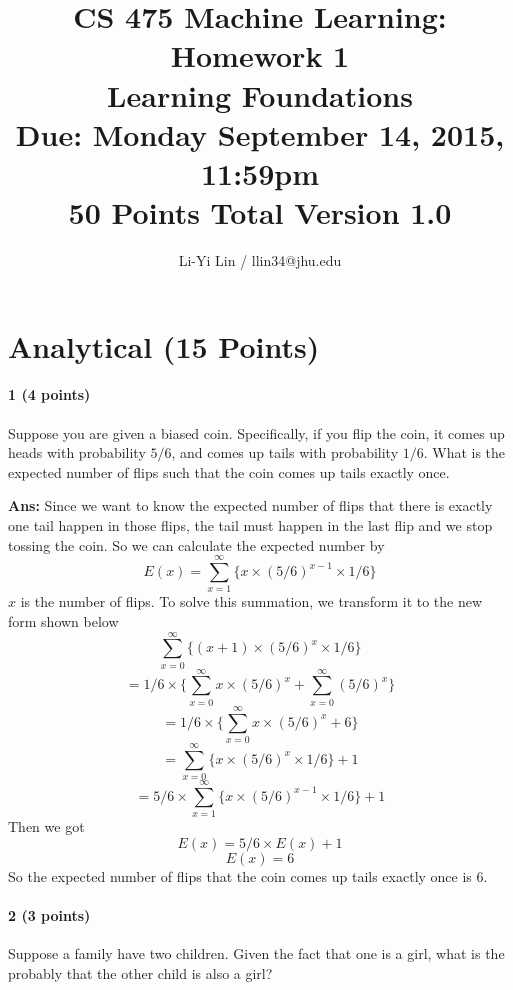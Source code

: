 \documentclass[11pt]{article}
\title{CS 475 Machine Learning: Homework 1\\Learning Foundations\\
\Large{Due: Monday September 14, 2015, 11:59pm}\\
50 Points Total \hspace{1cm} Version 1.0}
\author{Li-Yi Lin / llin34@jhu.edu}
\date{}
\begin{document}
\large
\maketitle
\thispagestyle{headings}

\vspace{-.5in}




\section{Analytical (15 Points)}

\paragraph{1 (4 points)} Suppose you are given a biased coin. Specifically, if you flip the coin, it comes up heads with probability $5/6$, and comes up tails with probability $1/6$.  What is the expected number of flips such that the coin comes up tails exactly once.

\noindent
\textbf{Ans:} 
Since we want to know the expected number of flips that there is exactly one tail happen in those flips, the tail must happen in the last flip and we stop tossing the coin. So we can calculate the expected number by 
$$E(x) = \sum_{x = 1}^{\infty} \{x \times (5/6)^{x-1} \times 1/6\}$$
$x$ is the number of flips.
To solve this summation, we transform it to the new form shown below
$$\sum_{x=0}^{\infty} \{(x + 1) \times (5/6)^{x} \times 1/6\} $$
$$= 1/6 \times \{\sum_{x=0}^{\infty} x \times (5/6)^{x} + \sum_{x=0}^{\infty} (5/6)^{x}\}$$
$$= 1/6 \times \{\sum_{x=0}^{\infty} x \times (5/6)^{x} + 6\}$$
$$= \sum_{x = 0}^{\infty} \{x \times (5/6)^{x} \times 1/6\} + 1$$
$$= 5/6 \times \sum_{x = 1}^{\infty} \{x \times (5/6)^{x-1} \times 1/6\} + 1$$
Then we got
$$E(x) = 5/6 \times E(x) + 1$$
$$E(x) = 6$$
So the expected number of flips that the coin comes up tails exactly once is 6.


\paragraph{2 (3 points)} Suppose a family have two children. Given the fact that one is a girl, what is the probably that the other child is also a girl?
\end{document}

